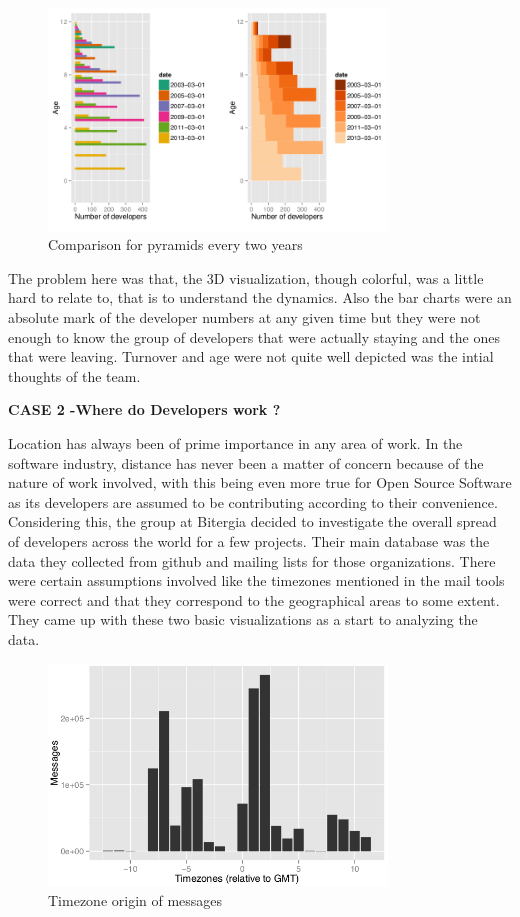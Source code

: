 \documentclass[seploa]{beavtex}
\begin{document}
\begin{figure}[!ht]
\centering
\includegraphics[width=90mm]{age1.png}
\caption{Comparison for pyramids every two years}
\end{figure}

The problem here was that, the 3D visualization, though colorful, was a little hard to relate to, that is to understand the dynamics. Also the bar charts were an absolute mark of the developer numbers at any given time but they were not enough to know the group of developers that were actually staying and the ones that were leaving. Turnover and age were not quite well depicted was the intial thoughts of the team.

 \textbf{CASE 2 -Where do Developers work ?}

Location has always been of prime importance in any area of work. In the software industry, distance has never been a matter of concern because of the nature of work involved, with this being even more true for Open Source Software as its developers are assumed to be contributing according to their convenience\cite{yuri2010}. Considering this, the group at Bitergia decided to investigate the overall spread of developers across the world for a few projects. Their main database was the data they collected from github and mailing lists for those organizations. There were certain assumptions involved like the timezones mentioned in the mail tools were correct and that they correspond to the geographical areas to some extent. They came up with these two basic visualizations as a start to analyzing the data.

\begin{figure}[!ht]
\centering
\includegraphics[width=90mm]{work1.png}
\caption{Timezone origin of messages}
\end{figure}
\end{document}

